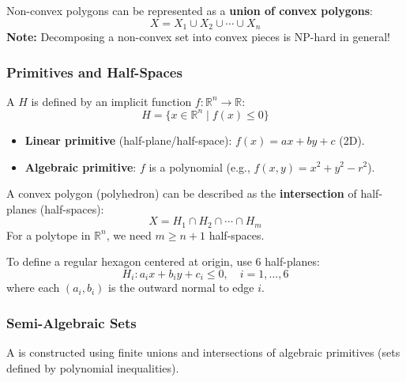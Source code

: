 \begin{tipbox}
Non-convex polygons can be represented as a \textbf{union of convex polygons}:
\[
X = X_1 \cup X_2 \cup \cdots \cup X_n
\]
\textbf{Note:} Decomposing a non-convex set into convex pieces is NP-hard in general!
\end{tipbox}

\separator

\subsubsection{Primitives and Half-Spaces}

\begin{defbox}[Primitive]
A  $H$ is defined by an implicit function $f: \mathbb{R}^n \to \mathbb{R}$:
\[
H = \{x \in \mathbb{R}^n \mid f(x) \leq 0\}
\]
\begin{itemize}
  \item \textbf{Linear primitive} (half-plane/half-space): $f(x) = ax + by + c$ (2D).
  \item \textbf{Algebraic primitive}: $f$ is a polynomial (e.g., $f(x,y) = x^2 + y^2 - r^2$).
\end{itemize}
\end{defbox}

\begin{thmbox}
A convex polygon (polyhedron) can be described as the \textbf{intersection} of half-planes (half-spaces):
\[
X = H_1 \cap H_2 \cap \cdots \cap H_m
\]
For a polytope in $\mathbb{R}^n$, we need $m \geq n+1$ half-spaces.
\end{thmbox}

\begin{exbox}
To define a regular hexagon centered at origin, use 6 half-planes:
\[
H_i: a_i x + b_i y + c_i \leq 0, \quad i = 1, \ldots, 6
\]
where each $(a_i, b_i)$ is the outward normal to edge $i$.
\end{exbox}

\separator

\subsubsection{Semi-Algebraic Sets}

\begin{defbox}
A  is constructed using finite unions and intersections of algebraic primitives (sets defined by polynomial inequalities).
\end{defbox}

